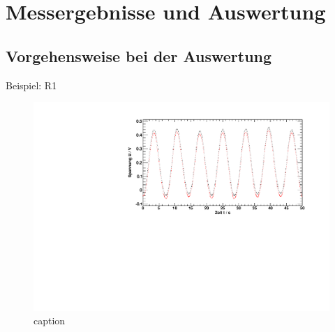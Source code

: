 \section{Messergebnisse und Auswertung}

\subsection{Vorgehensweise bei der Auswertung}
Beispiel: R1
\begin{figure}[H]
\begin{center}
  \includegraphics[width=\textwidth]{../img/both_Spule_R1.pdf}
  \caption{caption}
  \label{img:ex:both}
\end{center}
\end{figure}


